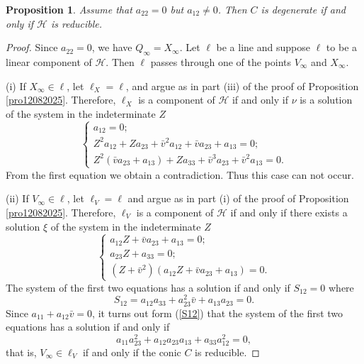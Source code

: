 \documentclass[sn-mathphys-num]{sn-jnl}%
\newtheorem{proposition}[theorem]{Proposition}
\begin{document}
\begin{proposition}
\label{pro12082025AA} Assume that $a_{22}=0$ but $a_{12}\ne 0$. Then $C$ is degenerate if and only if $\mathcal{H}$ is reducible. 
\end{proposition}
\begin{proof} Since $a_{22}=0$, we have $Q_\infty=X_\infty$.
Let $\ell$ be a line and suppose $\ell$ to be a linear component of $\mathcal{H}$. Then $\ell$ passes through one of the points $V_\infty$ and $X_\infty$.

(i)  If $X_\infty\in \ell$, let $\ell_X=\ell$, and  argue as in part (iii) of the proof of Proposition \ref{pro12082025}.
Therefore, $\ell_X$ is a component of $\mathcal{H}$ if and only if $\nu$ is a solution of the system in the indeterminate $Z$
\begin{equation*}
\label{eq09082025AAAA}
\begin{cases}a_{12}=0; \\
Z^2a_{12}+Za_{23}+\bar{v}^2a_{12}+\bar{v}a_{23}+a_{13}=0;\\
Z^2(\bar{v}a_{23}+a_{13})+Za_{33}+\bar{v}^3a_{23}+\bar{v}^2a_{13}=0.
\end{cases}
\end{equation*}
From the first equation we obtain a contradiction. Thus this case can not occur.

(ii) If $V_\infty\in \ell$, let $\ell_V=\ell$ and argue as in part (i) of the proof of Proposition \ref{pro12082025}.  Therefore, $\ell_V$ is a component of $\mathcal{H}$ if and only if there exists a solution $\xi$ of the system in the indeterminate $Z$
\begin{equation*}
\label{eq09082025CCC}
\begin{cases}
a_{12}Z+\bar{v}a_{23}+a_{13}=0;\\
a_{23}Z+a_{33}=0;\\
(Z+\bar{v}^2)(a_{12}Z+\bar{v}a_{23}+a_{13})=0.
\end{cases}
\end{equation*}
The system of the first two equations has a solution if and only if $S_{12}=0$ where
\begin{equation} \label{S12}
    S_{12}=a_{12}a_{33}+a_{23}^2\bar{v}+a_{13}a_{23}=0.
\end{equation}
Since $a_{11}+a_{12}\bar{v}=0$, it turns out form (\ref{S12}) that the system of the first two equations has a solution if and only if
$$a_{11}a_{23}^2+a_{12}a_{23}a_{13}+a_{33}a_{12}^2=0,$$
that is, $V_\infty\in\ell_V$ if and only if the conic $C$ is reducible.
\end{proof}
\end{document}
